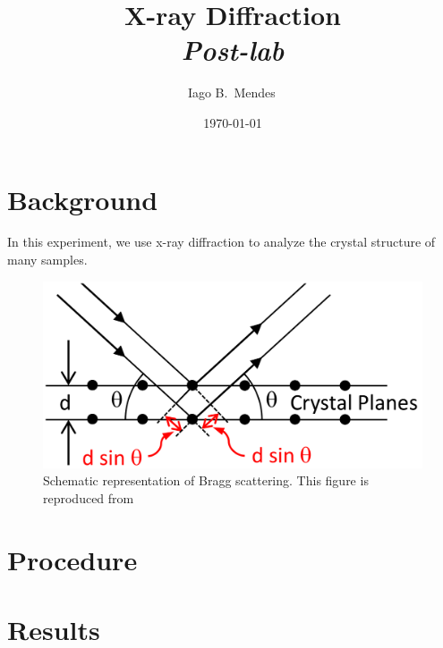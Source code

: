 \documentclass{../paper}
\begin{document}
\title{X-ray Diffraction \\ {\em Post-lab}}

\author{Iago B.~Mendes\,}

\date{\today}

\maketitle

\section{Background}

In this experiment, we use x-ray diffraction to analyze the crystal structure of many samples.

\begin{figure}
  \centering
  \includegraphics[width=0.6\columnwidth]{assets/bragg-scattering.png}
  \caption{Schematic representation of Bragg scattering. This figure is reproduced from \cite{LabManual}}
  \label{fig:angles}
\end{figure}

\section{Procedure}


\section{Results}
\end{document}
